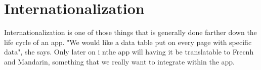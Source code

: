 \maketitle{}
\section{ Internationalization }

Internationalization is one of those things that is generally done farther down
the life cycle of an app. "We would like a data table put on every page with
specific data", she says. Only later on i nthe app will having it be
translatable to Frecnh and Mandarin, something that we really want to integrate
within the app.
